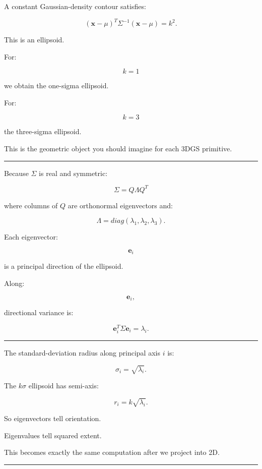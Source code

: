 A constant Gaussian-density contour satisfies:

\[
(\mathbf x-\mu)^T
\Sigma^{-1}
(\mathbf x-\mu)
=
k^2.
\]

This is an ellipsoid.

For:

\[
k=1
\]

we obtain the one-sigma ellipsoid.

For:

\[
k=3
\]

the three-sigma ellipsoid.

This is the geometric object you should imagine for each 3DGS primitive.

\begin{center}\rule{0.5\linewidth}{0.5pt}\end{center}

Because \(\Sigma\) is real and symmetric:

\[
\Sigma
=
Q\Lambda Q^T
\]

where columns of \(Q\) are orthonormal eigenvectors and:

\[
\Lambda=
diag(
\lambda_1,
\lambda_2,
\lambda_3
).
\]

Each eigenvector:

\[
\mathbf e_i
\]

is a principal direction of the ellipsoid.

Along:

\[
\mathbf e_i,
\]

directional variance is:

\[
\mathbf e_i^T
\Sigma
\mathbf e_i
=
\lambda_i.
\]

\begin{center}\rule{0.5\linewidth}{0.5pt}\end{center}

The standard-deviation radius along principal axis \(i\) is:

\[
\boxed{
\sigma_i=
\sqrt{\lambda_i}.
}
\]

The \(k\sigma\) ellipsoid has semi-axis:

\[
\boxed{
r_i=
k\sqrt{\lambda_i}.
}
\]

So eigenvectors tell orientation.

Eigenvalues tell squared extent.

This becomes exactly the same computation after we project into 2D.

\begin{center}\rule{0.5\linewidth}{0.5pt}\end{center}

